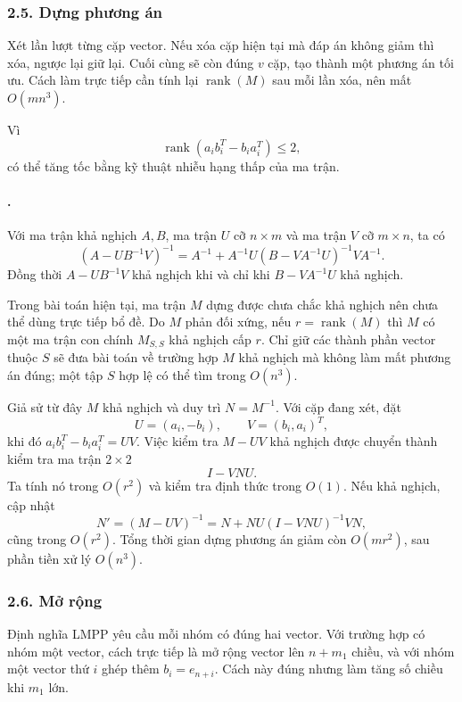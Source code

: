 \documentclass[11pt]{article}
\begin{document}
\subsubsection*{2.5. Dựng phương án}

Xét lần lượt từng cặp vector. Nếu xóa cặp hiện tại mà đáp án không giảm thì xóa,
ngược lại giữ lại. Cuối cùng sẽ còn đúng \(v\) cặp, tạo thành một phương án tối
ưu. Cách làm trực tiếp cần tính lại \(\operatorname{rank}(M)\) sau mỗi lần xóa,
nên mất \(O(mn^3)\).

Vì
\[
  \operatorname{rank}(a_ib_i^T-b_ia_i^T)\le 2,
\]
có thể tăng tốc bằng kỹ thuật nhiễu hạng thấp của ma trận.

\paragraph{.}
Với ma trận khả nghịch \(A,B\), ma trận \(U\) cỡ \(n\times m\) và ma trận \(V\)
cỡ \(m\times n\), ta có
\[
  (A-UB^{-1}V)^{-1}
  =A^{-1}+A^{-1}U(B-VA^{-1}U)^{-1}VA^{-1}.
\]
Đồng thời \(A-UB^{-1}V\) khả nghịch khi và chỉ khi
\(B-VA^{-1}U\) khả nghịch.

Trong bài toán hiện tại, ma trận \(M\) dựng được chưa chắc khả nghịch nên chưa
thể dùng trực tiếp bổ đề. Do \(M\) phản đối xứng, nếu \(r=\operatorname{rank}(M)\)
thì \(M\) có một ma trận con chính \(M_{S,S}\) khả nghịch cấp \(r\). Chỉ giữ các
thành phần vector thuộc \(S\) sẽ đưa bài toán về trường hợp \(M\) khả nghịch mà
không làm mất phương án đúng; một tập \(S\) hợp lệ có thể tìm trong \(O(n^3)\).

Giả sử từ đây \(M\) khả nghịch và duy trì \(N=M^{-1}\). Với cặp đang xét, đặt
\[
  U=(a_i,-b_i),\qquad V=(b_i,a_i)^T,
\]
khi đó \(a_ib_i^T-b_ia_i^T=UV\). Việc kiểm tra \(M-UV\) khả nghịch được chuyển
thành kiểm tra ma trận \(2\times2\)
\[
  I-VNU.
\]
Ta tính nó trong \(O(r^2)\) và kiểm tra định thức trong \(O(1)\). Nếu khả
nghịch, cập nhật
\[
  N'=(M-UV)^{-1}=N+NU(I-VNU)^{-1}VN,
\]
cũng trong \(O(r^2)\). Tổng thời gian dựng phương án giảm còn \(O(mr^2)\), sau
phần tiền xử lý \(O(n^3)\).

\subsubsection*{2.6. Mở rộng}

Định nghĩa LMPP yêu cầu mỗi nhóm có đúng hai vector. Với trường hợp có nhóm một
vector, cách trực tiếp là mở rộng vector lên \(n+m_1\) chiều, và với nhóm một
vector thứ \(i\) ghép thêm \(b_i=e_{n+i}\). Cách này đúng nhưng làm tăng số
chiều khi \(m_1\) lớn.
\end{document}

